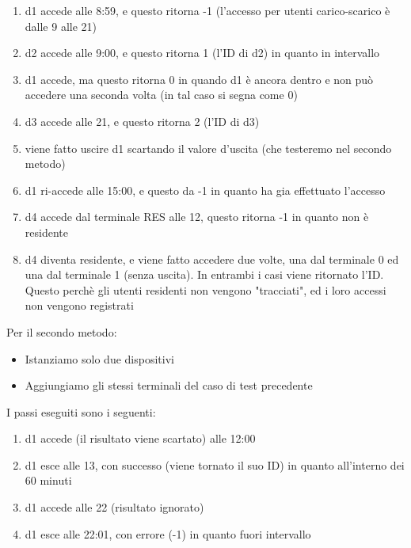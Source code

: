 \documentclass[12pt, letterpaper]{article}
\begin{document}
\begin{enumerate}
    \item d1 accede alle 8:59, e questo ritorna -1
    (l'accesso per utenti carico-scarico è dalle 
    9 alle 21)
    \item d2 accede alle 9:00, e questo ritorna 
    1 (l'ID di d2) in quanto in intervallo 
    \item d1 accede, ma questo ritorna 0 in quando 
    d1 è ancora dentro e non può accedere una 
    seconda volta (in tal caso si segna come 0)
    \item d3 accede alle 21, e questo ritorna 
    2 (l'ID di d3)
    \item viene fatto uscire d1 scartando il 
    valore d'uscita (che testeremo nel secondo 
    metodo)
    \item d1 ri-accede alle 15:00, e questo da 
    -1 in quanto ha gia effettuato l'accesso
    \item d4 accede dal terminale RES alle 12,
    questo ritorna -1 in quanto non è residente
    \item d4 diventa residente, e viene fatto 
    accedere due volte, una dal terminale 0 ed 
    una dal terminale 1 (senza uscita). In entrambi 
    i casi viene ritornato l'ID. Questo perchè
    gli utenti residenti non vengono "tracciati",
    ed i loro accessi non vengono registrati
\end{enumerate}

\noindent
Per il secondo metodo:

\begin{itemize}
    \item Istanziamo solo due dispositivi
    \item Aggiungiamo gli stessi terminali del 
    caso di test precedente 
\end{itemize}

\noindent
I passi eseguiti sono i seguenti:

\begin{enumerate}
    \item d1 accede (il risultato viene scartato)
    alle 12:00
    \item d1 esce alle 13, con successo (viene 
    tornato il suo ID) in quanto all'interno dei 
    60 minuti
    \item d1 accede alle 22 (risultato ignorato)
    \item d1 esce alle 22:01, con errore (-1) in 
    quanto fuori intervallo
\end{enumerate}
\end{document}
